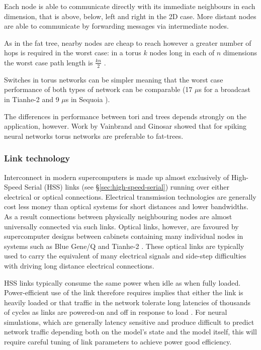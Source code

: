				Each node is able to communicate directly with its immediate neighbours
				in each dimension, that is above, below, left and right in the 2D case.
				More distant nodes are able to communicate by forwarding messages via
				intermediate nodes.
				
				As in the fat tree, nearby nodes are cheap to reach however a greater
				number of hops is required in the worst case: in a torus $k$ nodes long
				in each of $n$ dimensions the worst case path length is $\frac{kn}{2}$
				\cite{dally04}.
				
				Switches in torus networks can be simpler meaning that the worst case
				performance of both types of network can be comparable (17 $\mu$s for a
				broadcast in Tianhe-2 and 9 $\mu$s in Sequoia
				\cite{dongarra13,morozov12}).
				
				The differences in performance between tori and trees depends strongly
				on the application, however. Work by Vainbrand and Ginosar
				\cite{vainbrand11} showed that for spiking neural networks torus
				networks are preferable to fat-trees.
			
			\subsubsection{Link technology}
				
				Interconnect in modern supercomputers is made up almost exclusively of
				High-Speed Serial (HSS) links (see \S\ref{sec:high-speed-serial})
				running over either electrical or optical connections. Electrical
				transmission technologies are generally cost less money than optical
				systems for short distances and lower bandwidths. As a result
				connections between physically neighbouring nodes are almost universally
				connected via such links.  Optical links, however, are favoured by
				supercomputer designs between cabinets containing many individual nodes
				in systems such as Blue Gene/Q and Tianhe-2
				\cite{dongarra13,prickett10}.  These optical links are typically used to
				carry the equivalent of many electrical signals and side-step
				difficulties with driving long distance electrical connections.
				
				HSS links typically consume the same power when idle as when fully
				loaded.  Power-efficient use of the link therefore requires implies that
				either the link is heavily loaded or that traffic in the network
				tolerate long latencies of thousands of cycles as links are powered-on
				and off in response to load \cite{soteriou03}.  For neural simulations,
				which are generally latency sensitive and produce difficult to predict
				network traffic depending both on the model's state and the model
				itself, this will require careful tuning of link parameters to achieve
				power good efficiency.
				
